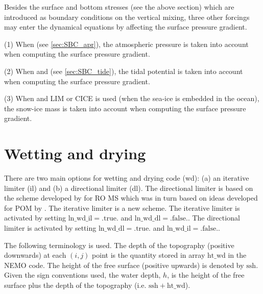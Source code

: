 \documentclass[../main/NEMO_manual]{subfiles}
\begin{document}
Besides the surface and bottom stresses (see the above section)
which are introduced as boundary conditions on the vertical mixing,
three other forcings may enter the dynamical equations by affecting the surface pressure gradient. 

(1) When  (see \autoref{sec:SBC_apr}),
the atmospheric pressure is taken into account when computing the surface pressure gradient.

(2) When  and  (see \autoref{sec:SBC_tide}),
the tidal potential is taken into account when computing the surface pressure gradient.

(3) When  and LIM or CICE is used
(\ie when the sea-ice is embedded in the ocean),
the snow-ice mass is taken into account when computing the surface pressure gradient.



\section{Wetting and drying }
\label{sec:DYN_wetdry}
There are two main options for wetting and drying code (wd):
(a) an iterative limiter (il) and (b) a directional limiter (dl).
The directional limiter is based on the scheme developed by \cite{WarnerEtal13} for RO
MS
which was in turn based on ideas developed for POM by \cite{Oey06}. The iterative
limiter is a new scheme.  The iterative limiter is activated by setting $\mathrm{ln\_wd\_il} = \mathrm{.true.}$
and $\mathrm{ln\_wd\_dl} = \mathrm{.false.}$. The directional limiter is activated
by setting $\mathrm{ln\_wd\_dl} = \mathrm{.true.}$ and $\mathrm{ln\_wd\_il} = \mathrm{.false.}$.


The following terminology is used. The depth of the topography (positive downwards)
at each $(i,j)$ point is the quantity stored in array $\mathrm{ht\_wd}$ in the NEMO code.
The height of the free surface (positive upwards) is denoted by $ \mathrm{ssh}$. Given the sign
conventions used, the water depth, $h$, is the height of the free surface plus the depth of the
topography (i.e. $\mathrm{ssh} + \mathrm{ht\_wd}$).
\end{document}
